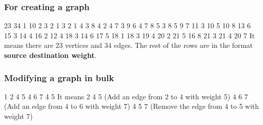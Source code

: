 \documentclass{article}
\begin{document}
\subsubsection{For creating a graph}
23 34 1 10 2 3 2 1 3 2 1 4 3 8 4 2 4 7 3 9 6 4 7 8 5 3 8 5 9 7 11 3 10 5 10 8 13 6 15 3 14 4 16 2 12 4 18 3 14 6 17 5 18 1 18 3 19 4 20 2 21 5 16 8 21 3 21 4 20 7\newline\newline
It means there are 23 vertices and 34 edges. The rest of the rows are in the format \textbf{source destination weight}.
\subsubsection{Modifying a graph in bulk}
1 2 4 5 4 6 7 4 5\newline\newline
It means 2 4 5 (Add an edge from 2 to 4 with weight 5) 4 6 7 (Add an edge from 4 to 6 with weight 7) 4 5 7 (Remove the edge from 4 to 5 with weight 7)
\end{document}
